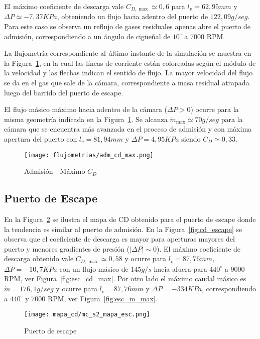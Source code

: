 El máximo coeficiente de descarga vale $C_{D,\max}\simeq 0,6$ para
$l_{v}=62,95 mm$ y $\Delta P\simeq -7,37 KPa$, obteniendo un flujo hacia adentro
del puerto de $122,09 g/seg$.
%
Para este caso se observa un reflujo de gases residuales apenas abre el puerto
de admisión, correspondiendo a un ángulo de cigüeñal de $10^{\circ}$ a $7000$
RPM.

La flujometría correspondiente al último instante de la simulación se muestra en
la Figura~\ref{fig:adm_cd_max}, en la cual las líneas de corriente están
coloreadas según el módulo de la velocidad y las flechas indican el sentido de
flujo.
%
La mayor velocidad del flujo se da en el gas que sale de la cámara,
correspondiente a masa residual atrapada luego del barrido del puerto de escape.


El flujo másico máximo hacia adentro de la cámara ($\Delta P>0$) ocurre para la
misma geometría indicada en la Figura~\ref{fig:adm_cd_max}.
%
Se alcanza $\dot{m}_{\max}\simeq 70 g/seg$ para la cámara que se encuentra más
avanzada en el proceso de admisión y con máxima apertura del puerto con
$l_{v}=81,94 mm$ y $\Delta P=4,95 KPa$ siendo $C_{D}\simeq 0,33$.

\begin{figure}[h]
    \centering
    \texttt{[image: flujometrias/adm\_cd\_max.png]}
    \caption{Admisión - Máximo $C_{D}$}\label{fig:adm_cd_max}
\end{figure}


\subsection{Puerto de Escape}
%
En la Figura~\ref{fig:mapa_cd_escape} se ilustra el mapa de CD obtenido para el
puerto de escape donde la tendencia es similar al puerto de admisión.
%
En la Figura~\ref{fig:cd_escape} se observa que el coeficiente de descarga es
mayor para aperturas mayores del puerto y menores gradientes de presión
($|\Delta P|\sim 0$).
%
El máximo coeficiente de descarga obtenido vale $C_{D,\max}\simeq 0,58$ y ocurre
para $l_{v}=87,76 mm$, $\Delta P=-10,7 KPa$ con un flujo másico de $145 g/s$
hacia afuera para $440^{\circ}$ a $9000$ RPM, ver Figura~\ref{fig:esc_cd_max}.
%
Por otro lado el máximo caudal másico es $\dot{m}=176,1 g/seg$ y ocurre para
$l_{v}=87,76 mm$ y $\Delta P=-334 KPa$, correspondiendo a $440^{\circ}$ y 7000
RPM, ver Figura~\ref{fig:esc_m_max}.

\begin{figure}[h]
    \centering
    \texttt{[image: mapa\_cd/mc\_s2\_mapa\_esc.png]}
    \caption{Puerto de escape}\label{fig:mapa_cd_escape}
\end{figure}

